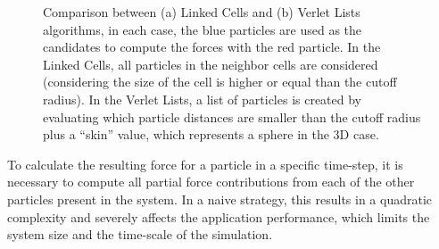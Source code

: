 \documentclass[preprint,12pt]{elsarticle}
\begin{document}
\begin{figure}[htb]
    \centering
    \caption{Comparison between (a) Linked Cells and (b) Verlet Lists algorithms, in each case, the blue particles are used as the candidates to compute the forces with the red particle. In the Linked Cells, all particles in the neighbor cells are considered (considering the size of the cell is higher or equal than the cutoff radius). In the Verlet Lists, a list of particles is created by evaluating which particle distances are smaller than the cutoff radius plus a ``skin'' value, which represents a sphere in the 3D case.}
\end{figure}

To calculate the resulting force for a particle in a specific time-step, it is necessary to compute all partial force contributions from each of the other particles present in the system.
In a naive strategy, this results in a quadratic complexity and severely affects the application performance, which limits the system size and the time-scale of the simulation.
\end{document}
